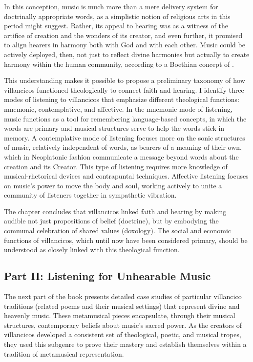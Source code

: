 \documentclass{vcbook-proposal}
\begin{document}
In this conception, music is much more than a mere delivery system for doctrinally appropriate words, as a simplistic notion of religious arts in this period might suggest.
Rather, its appeal to hearing was as a witness of the artifice of creation and the wonders of its creator, and even further, it promised to align hearers in harmony both with God and with each other.
Music could be actively deployed, then, not just to reflect divine harmonies but actually to create harmony within the human community, according to a Boethian concept of .

This understanding makes it possible to propose a preliminary taxonomy of how villancicos functioned theologically to connect faith and hearing. 
I identify three modes of listening to villancicos that emphasize different theological functions: mnemonic, contemplative, and affective.
In the mnemonic mode of listening, music functions as a tool for remembering language-based concepts, in which the words are primary and musical structures serve to help the words stick in memory.
A contemplative mode of listening focuses more on the sonic structures of  music, relatively independent of words, as bearers of a meaning of their own, which in Neoplatonic fashion communicate a message beyond words about the creation and its Creator.
This type of listening requires more knowledge of musical-rhetorical devices and contrapuntal techniques. 
Affective listening focuses on music's power to move the body and soul, working actively to unite a community of listeners together in sympathetic vibration.

The chapter concludes that villancicos linked faith and hearing by making audible not just propositions of belief (doctrine), but by embodying the communal celebration of shared values (doxology).
The social and economic functions of villancicos, which until now have been considered primary, should be understood as closely linked with this theological function.

\subsection{Part II: Listening for Unhearable Music}

The next part of the book presents detailed case studies of particular villancico traditions (related poems and their musical settings) that represent divine and heavenly music.
These metamusical pieces encapsulate, through their musical structures, contemporary beliefs about music's sacred power.
As the creators of villancicos developed a consistent set of theological, poetic, and musical tropes, they used this subgenre to prove their mastery and establish themselves within a tradition of metamusical representation.
\end{document}
